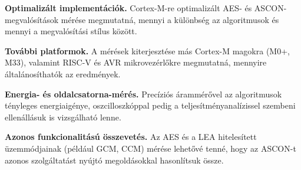 \documentclass[a4paper,12pt]{report}
\theoremstyle{definition}
\theoremstyle{remark}
\begin{document}
\textbf{Optimalizált implementációk.} Cortex-M-re optimalizált AES- és ASCON-megvalósítások mérése megmutatná, mennyi a különbség az algoritmusok és mennyi a megvalósítási stílus között.

\textbf{További platformok.} A mérések kiterjesztése más Cortex-M magokra (M0+, M33), valamint RISC-V és AVR mikrovezérlőkre megmutatná, mennyire általánosíthatók az eredmények.

\textbf{Energia- és oldalcsatorna-mérés.} Precíziós árammérővel az algoritmusok tényleges energiaigénye, oszcilloszkóppal pedig a teljesítményanalízissel szembeni ellenállásuk is vizsgálható lenne.

\textbf{Azonos funkcionalitású összevetés.} Az AES és a LEA hitelesített üzemmódjainak (például GCM, CCM) mérése lehetővé tenné, hogy az ASCON-t azonos szolgáltatást nyújtó megoldásokkal hasonlítsuk össze.
\end{document}
